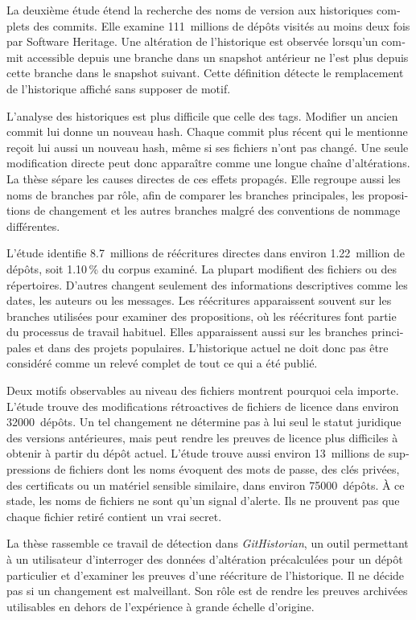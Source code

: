 \begin{otherlanguage}{french}
\begin{SingleSpace}
La deuxième étude étend la recherche des noms de version aux historiques complets des commits.
Elle examine \num{111}~millions de dépôts visités au moins deux fois par Software Heritage.
Une altération de l'historique est observée lorsqu'un commit accessible depuis une branche dans un snapshot antérieur ne l'est plus depuis cette branche dans le snapshot suivant.
Cette définition détecte le remplacement de l'historique affiché sans supposer de motif.

L'analyse des historiques est plus difficile que celle des tags.
Modifier un ancien commit lui donne un nouveau hash.
Chaque commit plus récent qui le mentionne reçoit lui aussi un nouveau hash, même si ses fichiers n'ont pas changé.
Une seule modification directe peut donc apparaître comme une longue chaîne d'altérations.
La thèse sépare les causes directes de ces effets propagés.
Elle regroupe aussi les noms de branches par rôle, afin de comparer les branches principales, les propositions de changement et les autres branches malgré des conventions de nommage différentes.

L'étude identifie \num{8,7}~millions de réécritures directes dans environ \num{1,22}~million de dépôts, soit \num{1,10}\,\% du corpus examiné.
La plupart modifient des fichiers ou des répertoires.
D'autres changent seulement des informations descriptives comme les dates, les auteurs ou les messages.
Les réécritures apparaissent souvent sur les branches utilisées pour examiner des propositions, où les réécritures font partie du processus de travail habituel.
Elles apparaissent aussi sur les branches principales et dans des projets populaires.
L'historique actuel ne doit donc pas être considéré comme un relevé complet de tout ce qui a été publié.

Deux motifs observables au niveau des fichiers montrent pourquoi cela importe.
L'étude trouve des modifications rétroactives de fichiers de licence dans environ \num{32000}~dépôts.
Un tel changement ne détermine pas à lui seul le statut juridique des versions antérieures, mais peut rendre les preuves de licence plus difficiles à obtenir à partir du dépôt actuel.
L'étude trouve aussi environ \num{13}~millions de suppressions de fichiers dont les noms évoquent des mots de passe, des clés privées, des certificats ou un matériel sensible similaire, dans environ \num{75000}~dépôts.
À ce stade, les noms de fichiers ne sont qu'un signal d'alerte.
Ils ne prouvent pas que chaque fichier retiré contient un vrai secret.

La thèse rassemble ce travail de détection dans \textit{GitHistorian}, un outil permettant à un utilisateur d'interroger des données d'altération précalculées pour un dépôt particulier et d'examiner les preuves d'une réécriture de l'historique.
Il ne décide pas si un changement est malveillant.
Son rôle est de rendre les preuves archivées utilisables en dehors de l'expérience à grande échelle d'origine.


\end{SingleSpace}
\end{otherlanguage}
